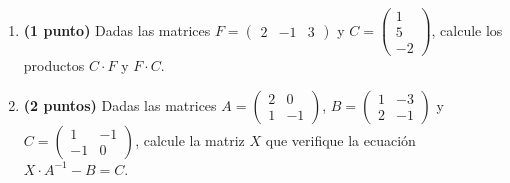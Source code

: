 
\begin{enumerate}[label=\alph*)]
\item \textbf{(1 punto)} Dadas las matrices $F=\begin{pmatrix}2&-1&3\end{pmatrix}$ y $C=\begin{pmatrix}1\\5\\-2\end{pmatrix}$, calcule los productos $C\cdot F$ y $F\cdot C$.
\item \textbf{(2 puntos)} Dadas las matrices $A=\begin{pmatrix}2&0\\1&-1\end{pmatrix}$, $B=\begin{pmatrix}1&-3\\2&-1\end{pmatrix}$ y $C=\begin{pmatrix}1&-1\\-1&0\end{pmatrix}$, calcule la matriz $X$ que verifique la ecuación $X\cdot A^{-1}-B=C$.
\end{enumerate}
